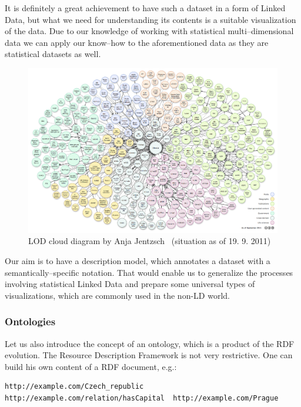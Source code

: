 It is definitely a great achievement to have such a dataset in a form of Linked Data, but
what we need for understanding its contents is a suitable visualization of the data.
Due to our knowledge of working with statistical multi--dimensional data we can apply our know--how
to the aforementioned data as they are statistical datasets as well.

\begin{figure}
	\centering
	\includegraphics[width=150mm]{img/lod-cloud.png}
	\caption{LOD cloud diagram by Anja Jentzsch~\cite{lod-cloud} (situation as of 19. 9. 2011)}
	\label{fig:lod-cloud}
\end{figure}

Our aim is to have a description model, which annotates a dataset with a semantically--specific
notation. That would enable us to generalize the processes involving statistical Linked Data
and prepare some universal types of visualizations, which are commonly used in the non-LD world.

\subsubsection{Ontologies}

Let us also introduce the concept of an ontology, which is a product of the RDF evolution.
The Resource Description Framework is not very restrictive. One can build his own content
of a RDF document, e.g.:

\scriptsize\begin{verbatim}
http://example.com/Czech_republic	http://example.com/relation/hasCapital	http://example.com/Prague
\end{verbatim}\normalsize

